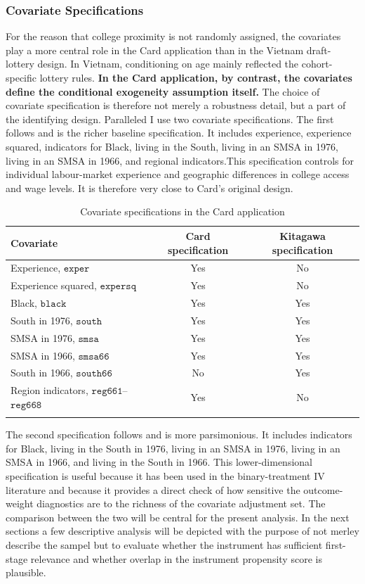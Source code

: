 \documentclass[12pt, a4paper, oneside]{article}
\theoremstyle{plain}
\theoremstyle{definition}
\begin{document}
\subsubsection{Covariate Specifications}
For the reason that college proximity is not randomly assigned, the covariates play a more central role in the Card application than in the Vietnam draft-lottery design.
In Vietnam, conditioning on age mainly reflected the cohort-specific lottery rules. \textbf{In the Card application, by contrast, the covariates define the conditional exogeneity assumption itself.}
The choice of covariate specification is therefore not merely a robustness detail, but a part of the identifying design. 
Paralleled \citet{sloczynski2025abadie} I use two covariate specifications. The first follows \citet{card1993using} and is the richer baseline specification. It includes experience, experience squared, indicators for Black, living in the South, living in an SMSA in 1976, living in an SMSA in 1966, and regional indicators.This specification controls for individual labour-market experience and geographic differences in college access and wage levels. It is therefore very close to Card's original design.
\begin{table}[htbp]
\centering
\caption{Covariate specifications in the Card application}
\label{tab:card_covariates}
\small
\begin{tabular}{lcc}
\toprule
Covariate & Card specification & Kitagawa specification \\
\midrule
Experience, $\texttt{exper}$ & Yes & No \\
Experience squared, $\texttt{expersq}$ & Yes & No \\
Black, $\texttt{black}$ & Yes & Yes \\
South in 1976, $\texttt{south}$ & Yes & Yes \\
SMSA in 1976, $\texttt{smsa}$ & Yes & Yes \\
SMSA in 1966, $\texttt{smsa66}$ & Yes & Yes \\
South in 1966, $\texttt{south66}$ & No & Yes \\
Region indicators, $\texttt{reg661}$--$\texttt{reg668}$ & Yes & No \\
\bottomrule
\addlinespace[4pt]
\end{tabular}
\end{table}
The second specification follows \citet{kitagawa2015test}
and is more parsimonious. It includes indicators for Black, living in the South in 1976, living in an SMSA in 1976, living in an SMSA in 1966, and living in the South in 1966. This lower-dimensional specification is useful because it has been used in the binary-treatment IV literature and because it provides a direct check of how sensitive the outcome-weight diagnostics are to the richness of the covariate adjustment set.
The comparison between the two will be central for the present analysis.
In the next sections a few descriptive analysis will be depicted with the purpose of not merley describe the sampel but to evaluate whether the instrument has sufficient first-stage relevance and whether overlap in the instrument propensity score is plausible.
\end{document}
